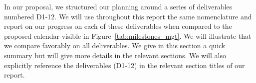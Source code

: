 
\begin{summary}
In our proposal, we structured our planning around a series of deliverables
numbered D1-12. We will use throughout this report the same nomenclature and
report on our progress on each of these deliverables when compared to the
proposed calendar visible in Figure~\ref{tab:milestones_mgt}. We will
illustrate that we compare favorably on all deliverables. We give in this section a quick summary but will give more details in the relevant sections. We will also
explicitly reference  the deliverables (D1-12) in the relevant section titles of our report.
\end{summary}






